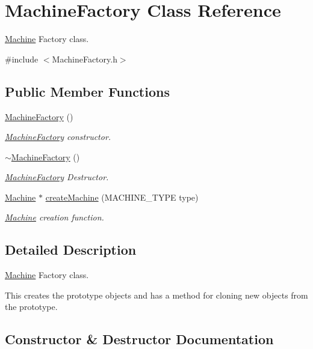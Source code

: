 \hypertarget{class_machine_factory}{}\section{Machine\+Factory Class Reference}
\label{class_machine_factory}


\hyperlink{class_machine}{Machine} Factory class.  




{\ttfamily \#include $<$Machine\+Factory.\+h$>$}

\subsection*{Public Member Functions}
\begin{DoxyCompactItemize}
\item 
\hyperlink{class_machine_factory_ae585766b671db16d78d4d580d80261f1}{Machine\+Factory} ()
\begin{DoxyCompactList}\small\item\em \hyperlink{class_machine_factory}{Machine\+Factory} constructor. \end{DoxyCompactList}\item 
\hyperlink{class_machine_factory_a098ac5638472df854885d9973444daf5}{$\sim$\+Machine\+Factory} ()
\begin{DoxyCompactList}\small\item\em \hyperlink{class_machine_factory}{Machine\+Factory} Destructor. \end{DoxyCompactList}\item 
\hyperlink{class_machine}{Machine} $\ast$ \hyperlink{class_machine_factory_a1ce75d92c7342129acab9384560aa3b5}{create\+Machine} (M\+A\+C\+H\+I\+N\+E\+\_\+\+T\+Y\+P\+E type)
\begin{DoxyCompactList}\small\item\em \hyperlink{class_machine}{Machine} creation function. \end{DoxyCompactList}\end{DoxyCompactItemize}


\subsection{Detailed Description}
\hyperlink{class_machine}{Machine} Factory class. 

This creates the prototype objects and has a method for cloning new objects from the prototype. 

\subsection{Constructor \& Destructor Documentation}
\hypertarget{class_machine_factory_ae585766b671db16d78d4d580d80261f1}{}
